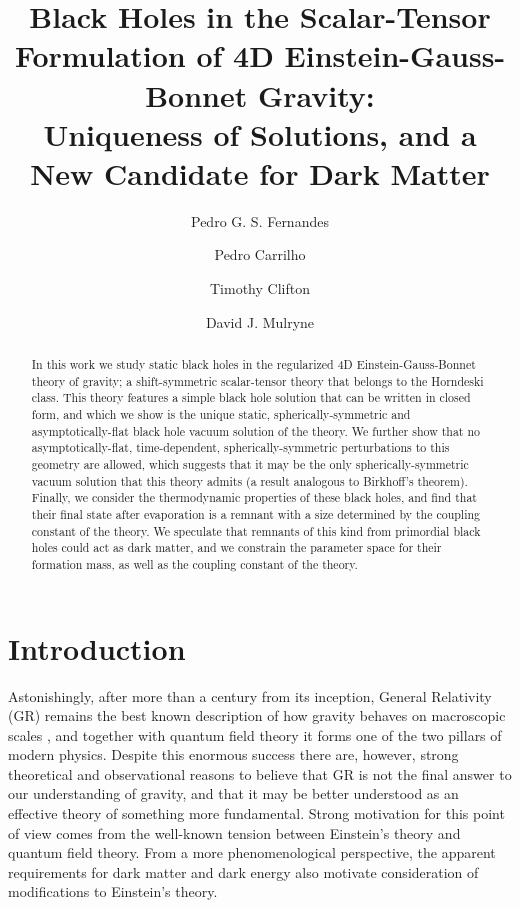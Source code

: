 \documentclass[reprint,amsmath,amssymbGaps,onecolumn,notitlepage,nofootinbib]{revtex4-1}
\begin{document}
\title{Black Holes in the Scalar-Tensor Formulation of 4D Einstein-Gauss-Bonnet Gravity: \\ Uniqueness of Solutions, and a New Candidate for Dark Matter}

\author{Pedro G. S. Fernandes}
\author{Pedro Carrilho}
\author{Timothy Clifton}
\author{David J. Mulryne}


\begin{abstract}

\par In this work we study static black holes in the regularized 4D Einstein-Gauss-Bonnet theory of gravity; a shift-symmetric scalar-tensor theory that belongs to the Horndeski class. This theory features a simple black hole solution that can be written in closed form, and which we show is the unique static, spherically-symmetric and asymptotically-flat black hole vacuum solution of the theory. We further show that no asymptotically-flat, time-dependent, spherically-symmetric perturbations to this geometry are allowed, which suggests that it may be the only spherically-symmetric vacuum solution that this theory admits (a result analogous to Birkhoff's theorem). Finally, we consider the thermodynamic properties of these black holes, and find that their final state after evaporation is a remnant with a size determined by the coupling constant of the theory. We speculate that remnants of this kind from primordial black holes could act as dark matter, and we constrain the parameter space for their formation mass, as well as the coupling constant of the theory.


\end{abstract}

\maketitle

\section{Introduction} \label{intro}
\par Astonishingly, after more than a century from its inception, General Relativity (GR) remains the best known description of how gravity behaves on macroscopic scales \cite{Will:2014kxa,Ishak:2018his}, and together with quantum field theory it forms one of the two pillars of modern physics. Despite this enormous success there are, however, strong theoretical and observational reasons to believe that GR is not the final answer to our understanding of gravity, and that it may be better understood as an effective theory of something more fundamental. Strong motivation for this point of view comes from the well-known tension between Einstein's theory and quantum field theory. From a more phenomenological perspective, the apparent requirements for dark matter and dark energy also motivate consideration of modifications to Einstein's theory.
\end{document}
